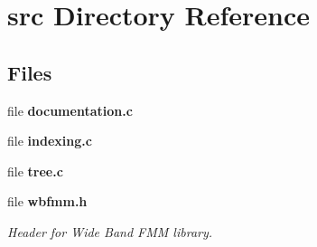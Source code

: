 \section{src Directory Reference}
\label{dir_68267d1309a1af8e8297ef4c3efbcdba}
\subsection*{Files}
\begin{DoxyCompactItemize}
\item 
file {\bfseries documentation.\+c}
\item 
file {\bfseries indexing.\+c}
\item 
file {\bf tree.\+c}
\item 
file {\bf wbfmm.\+h}
\begin{DoxyCompactList}\small\item\em Header for Wide Band F\+M\+M library. \end{DoxyCompactList}\end{DoxyCompactItemize}
